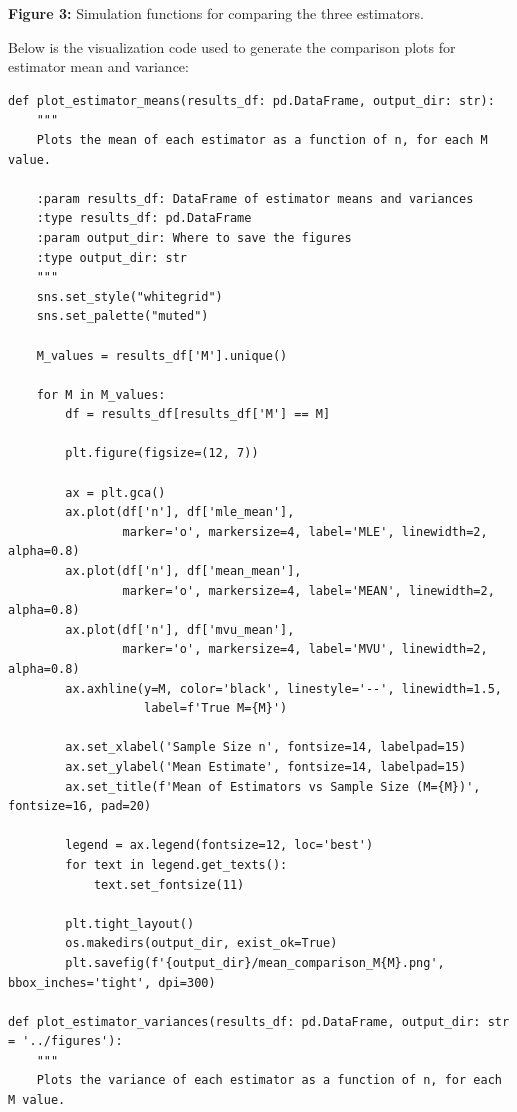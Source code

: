 \begin{center}
\textbf{Figure 3:} Simulation functions for comparing the three estimators.
\end{center}

Below is the visualization code used to generate the comparison plots for estimator mean and variance:

\begin{verbatim}
def plot_estimator_means(results_df: pd.DataFrame, output_dir: str):
    """
    Plots the mean of each estimator as a function of n, for each M value.
    
    :param results_df: DataFrame of estimator means and variances
    :type results_df: pd.DataFrame
    :param output_dir: Where to save the figures
    :type output_dir: str
    """
    sns.set_style("whitegrid")
    sns.set_palette("muted")
    
    M_values = results_df['M'].unique()
    
    for M in M_values:
        df = results_df[results_df['M'] == M]
        
        plt.figure(figsize=(12, 7))
        
        ax = plt.gca()
        ax.plot(df['n'], df['mle_mean'], 
                marker='o', markersize=4, label='MLE', linewidth=2, alpha=0.8)
        ax.plot(df['n'], df['mean_mean'], 
                marker='o', markersize=4, label='MEAN', linewidth=2, alpha=0.8)
        ax.plot(df['n'], df['mvu_mean'], 
                marker='o', markersize=4, label='MVU', linewidth=2, alpha=0.8)
        ax.axhline(y=M, color='black', linestyle='--', linewidth=1.5, 
                   label=f'True M={M}')
        
        ax.set_xlabel('Sample Size n', fontsize=14, labelpad=15)
        ax.set_ylabel('Mean Estimate', fontsize=14, labelpad=15)
        ax.set_title(f'Mean of Estimators vs Sample Size (M={M})', fontsize=16, pad=20)
        
        legend = ax.legend(fontsize=12, loc='best')
        for text in legend.get_texts():
            text.set_fontsize(11)
        
        plt.tight_layout()
        os.makedirs(output_dir, exist_ok=True)
        plt.savefig(f'{output_dir}/mean_comparison_M{M}.png', bbox_inches='tight', dpi=300)
        
def plot_estimator_variances(results_df: pd.DataFrame, output_dir: str = '../figures'):
    """
    Plots the variance of each estimator as a function of n, for each M value.
    

\end{verbatim}
